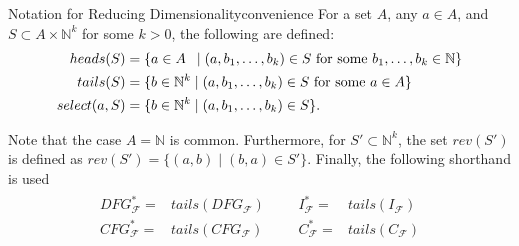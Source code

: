 \begin{definition}{Notation for Reducing Dimensionality}{convenience}
    For a set $A$, any $a\in A$, and $S\subset A\times\mathbb N^k$ for some
    $k>0$, the following are defined:
    \begin{align*}
        heads(S)={}&\{a\in A\hspace{1.8mm}\mid(a,b_1,\dots,b_k)\in S\text{ for some }b_1,\dots,b_k\in\mathbb N\}\\
        tails(S)={}&\{b\in\mathbb N^k\mid(a,b_1,\dots,b_k)\in S\text{ for some }a\in A\}\\
        select(a,S)={}&\{b\in\mathbb N^k\mid(a,b_1,\dots,b_k)\in S\}.
    \end{align*}

    Note that the case $A=\mathbb N$ is common.
    Furthermore, for $S'\subset\mathbb N^k$, the set $rev(S')$ is defined as
    $rev(S')=\{(a,b)\mid(b,a)\in S'\}$.
    Finally, the following shorthand is used
    \begin{align*}
        \begin{aligned}
        DFG_\mathcal F^*={}&tails(DFG_\mathcal F)\\
        CFG_\mathcal F^*={}&tails(CFG_\mathcal F)
        \end{aligned}&&
        \begin{aligned}
        I_\mathcal F^*={}&tails(I_\mathcal F)\\
        C_\mathcal F^*={}&tails(C_\mathcal F)
        \end{aligned}
    \end{align*}
\end{definition}